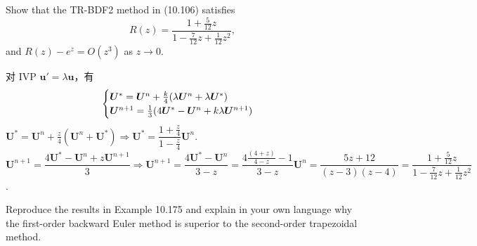 \documentclass[lang=cn,a4paper,newtx,bibend=bibtex]{elegantpaper}
\begin{document}
\begin{prob}[Exercise 10.171]
  Show that the TR-BDF2 method in (10.106) satisfies
  \[
    R(z) = \dfrac{1 + \frac5{12}z}{1 - \frac7{12}z + \frac1{12}z^2},
  \]
  and $R(z) - e^z = O(z^3)$ as $z \to 0$.
\end{prob}

\begin{solution}
  对 IVP $\bm{u}' = \lambda \bm{u}$，有
  \[
    \begin{cases} 
      \bm{U}^{*} = \bm{U}^n + \frac{k}4 (\lambda \bm{U}^n + \lambda \bm{U}^*) \\
      \bm{U}^{n+1} = \frac13 (4 \bm{U}^* - \bm{U}^n + k \lambda \bm{U}^{n+1})
     \end{cases}
  \]
  $\bm{U}^* = \bm{U}^n + \frac{z}4 (\bm{U}^n + \bm{U}^*) \Rightarrow \bm{U}^* = \dfrac{1 + \frac{z}4}{1 - \frac{z}4} \bm{U}^n$.\\
  $\bm{U}^{n+1} = \dfrac{4 \bm{U}^* - \bm{U}^n + z\bm{U}^{n+1}}{3} \Rightarrow \bm{U}^{n+1} = \dfrac{4 \bm{U}^* - \bm{U}^n}{3 - z} = \dfrac{4\frac{(4 + z)}{4 - z} - 1}{3 - z} \bm{U}^n = \dfrac{5z + 12}{(z - 3)(z - 4)} = \dfrac{1 + \frac{5}{12}z}{1 - \frac{7}{12}z + \frac1{12}z^2}$.
\end{solution}

\begin{prob}[Exercise 10.176]
  Reproduce the results in Example 10.175
and explain in your own language why the first-order backward
 Euler method is superior to the second-order trapezoidal method.
\end{prob}
\end{document}
